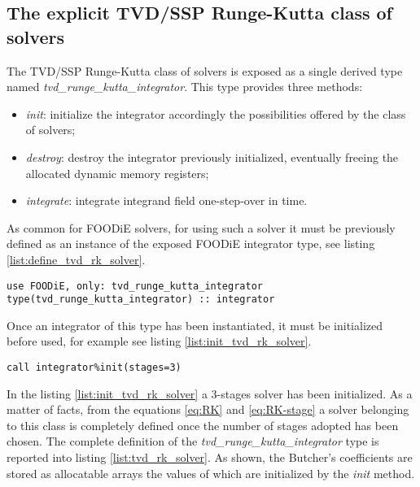 \subsection{The explicit TVD/SSP Runge-Kutta class of solvers}\label{subsec:solver_tvd_rk}

The TVD/SSP Runge-Kutta class of solvers is exposed as a single derived type named \emph{tvd\_runge\_kutta\_integrator}. This type provides three methods:

\begin{itemize}
  \item \emph{init}: initialize the integrator accordingly the possibilities offered by the class of solvers;
  \item \emph{destroy}: destroy the integrator previously initialized, eventually freeing the allocated dynamic memory registers;
  \item \emph{integrate}: integrate integrand field one-step-over in time.
  \end{itemize}

As common for FOODiE solvers, for using such a solver it must be previously defined as an instance of the exposed FOODiE integrator type, see listing \ref{list:define_tvd_rk_solver}.

\begin{lstlisting}[firstnumber=1,style=code,caption={definition of an explicit TVD/SSP Runge-Kutta integrator},label={list:define_tvd_rk_solver}]
use FOODiE, only: tvd_runge_kutta_integrator
type(tvd_runge_kutta_integrator) :: integrator
\end{lstlisting}

Once an integrator of this type has been instantiated, it must be initialized before used, for example see listing \ref{list:init_tvd_rk_solver}.

\begin{lstlisting}[firstnumber=1,style=code,caption={example of initialization of an explicit TVD/SSP Runge-Kutta integrator},label={list:init_tvd_rk_solver}]
call integrator%init(stages=3)
\end{lstlisting}

In the listing \ref{list:init_tvd_rk_solver} a 3-stages solver has been initialized. As a matter of facts, from the equations \ref{eq:RK} and \ref{eq:RK-stage} a solver belonging to this class is completely defined once the number of stages adopted has been chosen. The complete definition of the \emph{tvd\_runge\_kutta\_integrator} type is reported into listing \ref{list:tvd_rk_solver}. As shown, the Butcher's coefficients are stored as allocatable arrays the values of which are initialized by the \emph{init} method.

